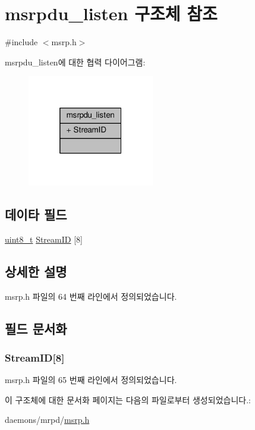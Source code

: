 \hypertarget{structmsrpdu__listen}{}\section{msrpdu\+\_\+listen 구조체 참조}
\label{structmsrpdu__listen}


{\ttfamily \#include $<$msrp.\+h$>$}



msrpdu\+\_\+listen에 대한 협력 다이어그램\+:
\nopagebreak
\begin{figure}[H]
\begin{center}
\leavevmode
\includegraphics[width=157pt]{structmsrpdu__listen__coll__graph}
\end{center}
\end{figure}
\subsection*{데이타 필드}
\begin{DoxyCompactItemize}
\item 
\hyperlink{stdint_8h_aba7bc1797add20fe3efdf37ced1182c5}{uint8\+\_\+t} \hyperlink{structmsrpdu__listen_a699f4611107a6da58e4e4153858c8578}{Stream\+ID} \mbox{[}8\mbox{]}
\end{DoxyCompactItemize}


\subsection{상세한 설명}


msrp.\+h 파일의 64 번째 라인에서 정의되었습니다.



\subsection{필드 문서화}
\subsubsection[{\texorpdfstring{Stream\+ID}{StreamID}}]{ Stream\+ID\mbox{[}8\mbox{]}}\hypertarget{structmsrpdu__listen_a699f4611107a6da58e4e4153858c8578}{}\label{structmsrpdu__listen_a699f4611107a6da58e4e4153858c8578}


msrp.\+h 파일의 65 번째 라인에서 정의되었습니다.



이 구조체에 대한 문서화 페이지는 다음의 파일로부터 생성되었습니다.\+:\begin{DoxyCompactItemize}
\item 
daemons/mrpd/\hyperlink{msrp_8h}{msrp.\+h}\end{DoxyCompactItemize}
